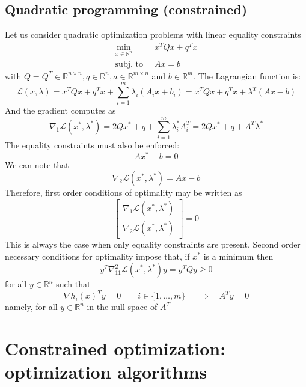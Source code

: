 \documentclass[openany]{book}
\newcommand{\R}{\mathbb{R}} %
\theoremstyle{definition}
\theoremstyle{remark}
\begin{document}
\subsection{Quadratic programming (constrained)}
Let us consider quadratic optimization problems with linear equality constraints 
\begin{align*}
    \min_{x\in\R^n}\ & x^TQx+q^Tx \\
    \text{subj. to }\ & Ax=b
\end{align*}
with $Q=Q^T\in\R^{n\times n}, q\in\R^n, a\in\R^{m\times n}$ and $b\in\R^m$.
The Lagrangian function is:
\[
    \mathcal{L}(x,\lambda) = x^TQx + q^Tx +\displaystyle\sum_{i=1}^{m}\lambda_i(A_ix+b_i) =  x^TQx + q^Tx + \lambda^T(Ax-b)
\]
And the gradient computes as 
\[
    \nabla_1 \mathcal{L}(x^*,\lambda^*) = 2Qx^* + q + \displaystyle\sum_{i=1}^{m}\lambda_i^*A_i^T =  2Qx^* + q + A^T\lambda^*
\]
The equality constraints must also be enforced: 
\[
    Ax^*-b = 0
\]
We can note that 
\[
    \nabla_2\mathcal{L}(x^*,\lambda^*) = Ax-b
\]
Therefore, first order conditions of optimality may be written as 
\[
    \begin{bmatrix}
        \nabla_1\mathcal{L}(x^*,\lambda^*)\\ \nabla_2\mathcal{L}(x^*,\lambda^*)
    \end{bmatrix} = 0
\]
This is always the case when only equality constraints are present. Second order necessary conditions for optimality impose that, if $x^*$ is a minimum then 
\[
    y^T\nabla^2_{11}\mathcal{L}(x^*,\lambda^*)y = y^TQy \geq 0
\]
for all $y\in\R^n$ such that 
\[
    \nabla h_i(x)^T y = 0 \qquad i\in\{1,\dots,m\} \quad \implies \quad A^Ty = 0
\]
namely, for all $y\in\R^n$ in the null-space of $A^T$
\section{Constrained optimization: optimization algorithms}
\end{document}
